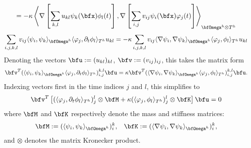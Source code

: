 \begin{example}
\begin{multline}
            =  - \kappa\left\langle\nabla\left[\sum_{k, l}u_{kl}\psi_{k}(\bfx)\phi_{l}(t)\right], \nabla\left[\sum_{i, j}v_{ij}\psi_{i}(\bfx)\varphi_{j}(t)\right]\right\rangle_{\bfOmega^{h}\otimes T^{h}}
        \end{multline}
        \begin{equation}
            \sum_{i, j, k, l}v_{ij}\langle\psi_{i}, \psi_{k}\rangle_{\bfOmega^{h}}\langle\varphi_{j}, \partial_{t}\phi_{l}\rangle_{T^{h}}u_{kl}  =  - \kappa\sum_{i, j, k, l}v_{ij}\langle\nabla\psi_{i}, \nabla\psi_{k}\rangle_{\bfOmega^{h}}\langle\varphi_{j}, \phi_{l}\rangle_{T^{h}}u_{kl}
        \end{equation}
        Denoting the vectors $\bfu  :=  (u_{kl})_{kl}$, $\bfv  :=  (v_{ij})_{ij}$, this takes the matrix form
        \begin{equation}
            \bfv^{T}(\langle\psi_{i}, \psi_{k}\rangle_{\bfOmega^{h}}\langle\varphi_{j}, \partial_{t}\phi_{l}\rangle_{T^{h}})_{i, j}^{k, l}\bfu  =  \kappa\bfv^{T}(\langle\nabla\psi_{i}, \nabla\psi_{k}\rangle_{\bfOmega^{h}}\langle\varphi_{j}, \phi_{l}\rangle_{T^{h}})_{i, j}^{k, l}\bfu.
        \end{equation}
        Indexing vectors first in the time indices $j$ and $l$, this simplifies to
        \begin{equation}
            \bfv^{T}\left[(\langle\varphi_{j}, \partial_{t}\phi_{l}\rangle_{T^{h}})_{j}^{l}\otimes\bfM + \kappa(\langle\varphi_{j}, \phi_{l}\rangle_{T^{h}})_{j}^{l}\otimes\bfK\right]\bfu  =  0
        \end{equation}
        where $\bfM$ and $\bfK$ respectively denote the mass and stiffness matrices:
        \begin{align}
            \bfM  :=  (\langle\psi_{i}, \psi_{k}\rangle_{\bfOmega^{h}})_{i}^{k},  &&
            \bfK  :=  (\langle\nabla\psi_{i}, \nabla\psi_{k}\rangle_{\bfOmega^{h}})_{i}^{k},
        \end{align}
        and $\otimes$ denotes the matrix Kronecker product.
        

\end{example}
